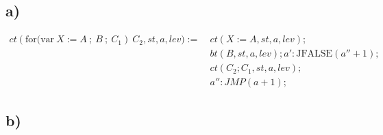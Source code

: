 \subsection*{a)}


\begin{equation*}
\begin{split}
ct(\text{for(var}\: X := A\:;\: B\:;\: C_1) \:C_2, st, a, lev) := \:& ct(X := A, st, a, lev); \\
		& bt(B, st, a, lev); a' : \text{JFALSE}(a'' + 1); \\
		& ct(C_2; C_1, st, a, lev); \\
		& a'': JMP(a + 1);
\end{split}
\end{equation*}

\subsection*{b)}